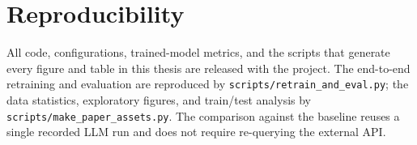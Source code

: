 \documentclass[11pt,a4paper]{report}
\begin{document}
\chapter*{Reproducibility}
All code, configurations, trained-model metrics, and the scripts that generate
every figure and table in this thesis are released with the project. The
end-to-end retraining and evaluation are reproduced by
\texttt{scripts/retrain\_and\_eval.py}; the data statistics, exploratory
figures, and train/test analysis by \texttt{scripts/make\_paper\_assets.py}.
The comparison against the baseline reuses a single recorded LLM run and does not
require re-querying the external API.



\end{document}
